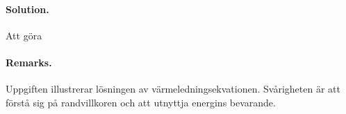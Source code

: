 \documentclass[%
oneside,                 %
final,                   %
10pt]{article}
\newenvironment{doconceexercise}{}{}
\begin{document}
\begin{doconceexercise}


\paragraph{Solution.}
Att göra



\paragraph{Remarks.}
Uppgiften illustrerar lösningen av värmeledningsekvationen. Svårigheten är att förstå sig på randvillkoren och att utnyttja energins bevarande.


\end{doconceexercise}



\end{document}
